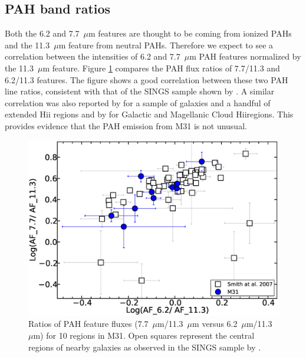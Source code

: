 %


\subsection{PAH band ratios}
\label{sect:pah_ratios}

Both the 6.2 and 7.7~$\mu$m features are thought to be coming from ionized PAHs and the 11.3~$\mu$m feature from neutral PAHs. Therefore we expect to see a correlation between the intensities of 6.2 and 7.7~$\mu$m PAH features normalized by the 11.3~$\mu$m feature.  Figure \ref{PAHlines}  compares the PAH flux ratios of 7.7/11.3  and 6.2/11.3 features. The figure shows a good correlation between these two PAH line ratios, consistent with that of the SINGS sample shown by \citet{Smith:2007lr}.
A similar correlation was also reported by  \citet{Galliano2008} for a sample of galaxies and a handful of extended H{\sc ii} regions
and by \citet{Vermeij2002} for Galactic and Magellanic Cloud H{\sc ii}regions. This provides evidence that the PAH emission from M31 is not unusual. 


\begin{figure}
\centering
\includegraphics[scale = 0.25]{./fig9.eps}
\caption{Ratios of PAH feature fluxes (7.7~$\mu$m/11.3~$\mu$m versus 6.2~$\mu$m/11.3~$\mu$m) for 10 regions in M31.
Open squares represent the central regions of nearby galaxies as observed in the SINGS sample by \citet{Smith:2007lr}.
}
\label{PAHlines}
\end{figure}

